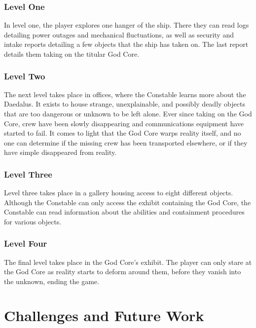 \documentclass{article}
\begin{document}
\subsubsection{Level One} \label{subsubsec:levelone}

In level one, the player explores one hanger of the ship. There they can read logs detailing power outages and mechanical fluctuations, as well as security and intake reports detailing a few objects that the ship has taken on. The last report details them taking on the titular God Core.

\subsubsection{Level Two} \label{subsubsec:leveltwo}

The next level takes place in offices, where the Constable learns more about the Daedalus. It exists to house strange, unexplainable, and possibly deadly objects that are too dangerous or unknown to be left alone. Ever since taking on the God Core, crew have been slowly disappearing and communications equipment have started to fail. It comes to light that the God Core warps reality itself, and no one can determine if the missing crew has been transported elsewhere, or if they have simple disappeared from reality.

\subsubsection{Level Three} \label{subsubsec:levelthree}

Level three takes place in a gallery housing access to eight different objects. Although the Constable can only access the exhibit containing the God Core, the Constable can read information about the abilities and containment procedures for various objects.

\subsubsection{Level Four} \label{subsubsec:four}

The final level takes place in the God Core's exhibit. The player can only stare at the God Core as reality starts to deform around them, before they vanish into the unknown, ending the game.

\section{Challenges and Future Work} \label{sec:problemsandfuture}
\end{document}
